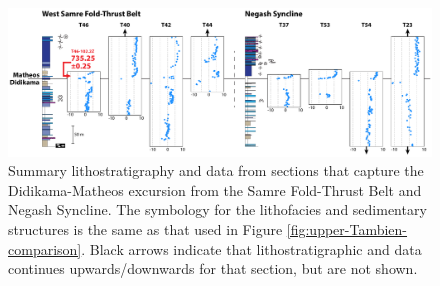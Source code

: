 \begin{figure}[h!]
\begin{center}
	\includegraphics[width=\textwidth]{figures/Tambien/Didikama-Matheos-sections.pdf}
	\caption[Lithostratigraphy and \dC chemostratigraphy from sections that capture the Didikama-Matheos excursion.]{Summary lithostratigraphy and \dC data from sections that capture the Didikama-Matheos excursion from the Samre Fold-Thrust Belt and Negash Syncline. The symbology for the lithofacies and sedimentary structures is the same as that used in Figure \ref{fig:upper-Tambien-comparison}. Black arrows indicate that lithostratigraphic and \dC data continues upwards/downwards for that section, but are not shown.}
	\label{fig:Didikama-Matheos-sections}
\end{center}
\end{figure}

